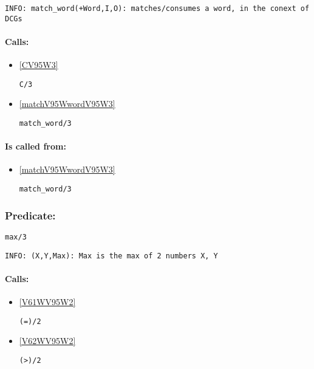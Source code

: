 {\small \begin{verbatim}
INFO: match_word(+Word,I,O): matches/consumes a word, in the conext of DCGs

\end{verbatim}}
\paragraph{Calls:} 
\begin{itemize}
\item \ref{CV95W3} 
\begin{verbatim}
C/3
\end{verbatim}

\item \ref{matchV95WwordV95W3} 
\begin{verbatim}
match_word/3
\end{verbatim}

\end{itemize}
\paragraph{Is called from:} 
\begin{itemize}
\item \ref{matchV95WwordV95W3} 
\begin{verbatim}
match_word/3
\end{verbatim}

\end{itemize}

\subsubsection{Predicate:} \label{maxV95W3}

\begin{verbatim}
max/3
\end{verbatim}

{\small \begin{verbatim}
INFO: (X,Y,Max): Max is the max of 2 numbers X, Y

\end{verbatim}}
\paragraph{Calls:} 
\begin{itemize}
\item \ref{V61WV95W2} 
\begin{verbatim}
(=)/2
\end{verbatim}

\item \ref{V62WV95W2} 
\begin{verbatim}
(>)/2
\end{verbatim}

\end{itemize}

